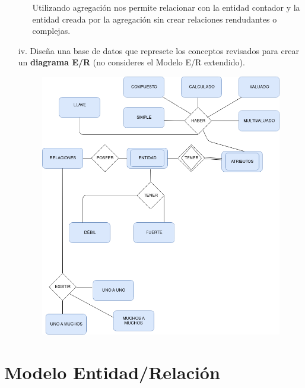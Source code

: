 \documentclass[letterpaper,11pt]{article}
\begin{document}
\begin{itemize}
\begin{itemize}
            Utilizando agregación nos permite relacionar  con la entidad
            contador y la entidad creada por la agregación sin crear
            relaciones rendudantes o complejas.

        \end{itemize}

    \item[iv.] Diseña una base de datos que represete los conceptos revisados
    para crear un \textbf{diagrama E/R} (no consideres el Modelo E/R extendido).
          \begin{figure}[h]
           \centering
           \includegraphics[scale=0.6]{./imagenes/iv.png}
           \end{figure}

\end{itemize}

\section{Modelo Entidad/Relación}
\end{document}
